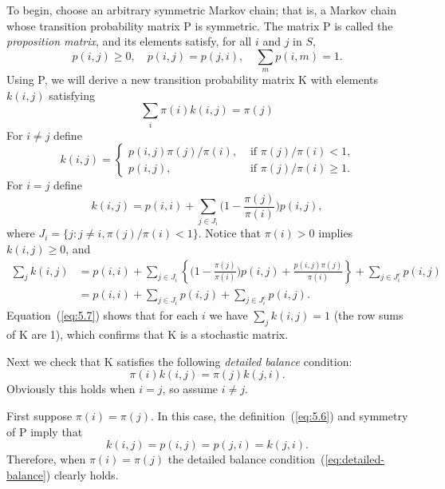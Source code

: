 \documentclass[12pt,letterpaper]{report}
\theoremstyle{plain}
\theoremstyle{definition}
\theoremstyle{remark}
\numberwithin{theorem}{chapter}
\numberwithin{claim}{chapter}
\numberwithin{equation}{chapter}
\numberwithin{conjecture}{chapter}
\newcommand\<{\ensuremath{\langle}}
\renewcommand\>{\ensuremath{\rangle}}
\begin{document}
To begin, choose an arbitrary symmetric Markov chain; that is, a Markov chain whose
transition probability matrix P is symmetric. The matrix P is called the 
\emph{proposition matrix}, and its elements
satisfy, for all $i$ and $j$ in $S$,
\begin{equation}
\label{eq:5.4}
p(i,j) \geq 0, \quad p(i,j) = p(j,i), \quad \sum_m p(i,m)=1.
\end{equation}
Using P, we will derive a new transition probability matrix K with elements
$k(i,j)$ satisfying
\begin{equation}
\label{eq:5.5}
\sum_i \pi(i)k(i,j) = \pi(j)
\end{equation}
For $i\neq j$ define
\begin{equation}
\label{eq:5.6}
k(i,j) = 
\begin{cases}
p(i,j)\pi(j)/\pi(i), & \text{ if $\pi(j)/\pi(i) < 1$,}\\
p(i,j), & \text{ if $\pi(j)/\pi(i) \geq 1$.}
\end{cases}
\end{equation}
%
%
%
%
For $i=j$ define
\begin{equation*}
k(i,j) = 
p(i,i) + \sum_{j\in J_i}\bigl(1 - \frac{\pi(j)}{\pi(i)}\bigr)p(i,j), 
\end{equation*}
where $J_i = \{j : j\neq i, \pi(j)/\pi(i) < 1\}$.
Notice that $\pi(i) > 0$ implies $k(i,j) \geq 0$, and
\begin{align}
\label{eq:5.7}
\sum_j k(i,j) 
&= p(i,i) + 
\sum_{j\in J_i}\left\{\bigl(1 - \frac{\pi(j)}{\pi(i)}\bigr)p(i,j)
+ \frac{p(i,j)\pi(j)}{\pi(i)}\right\} 
+ \sum_{j\in J_i^c}p(i,j)
\nonumber\\
&= p(i,i) + 
\sum_{j\in J_i}p(i,j)
+ \sum_{j\in J_i^c}p(i,j).
\end{align}
Equation~(\ref{eq:5.7}) shows that for each $i$ we have $\sum_j k(i,j) = 1$
(the row sums of K are 1), which confirms that K is a stochastic matrix.

Next we check that K satisfies the following \emph{detailed balance} condition:
\begin{equation}
\label{eq:detailed-balance}
\pi(i)k(i,j) = \pi(j)k(j,i).
\end{equation}
Obviously this holds when $i=j$, so assume $i\neq j$.

First suppose $\pi(i) = \pi(j)$.
In this case, the definition~(\ref{eq:5.6}) and symmetry of P imply that
\[
k(i,j) = p(i,j) = p(j,i) = k(j,i).
\]
Therefore, when $\pi(i) = \pi(j)$ the detailed balance
condition~(\ref{eq:detailed-balance}) clearly holds.
\end{document}
